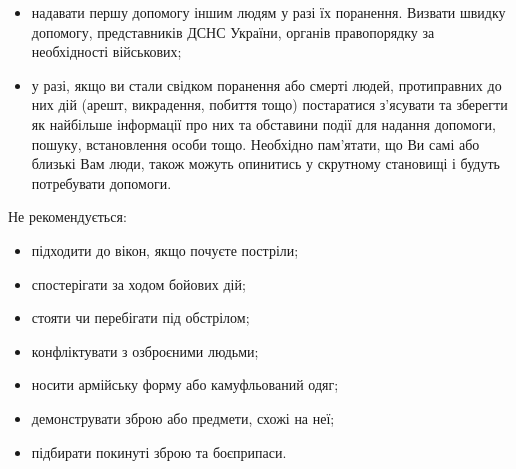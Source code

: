 \begin{itemize}
	\item надавати першу допомогу іншим людям у разі їх поранення. Визвати швидку допомогу, представників ДСНС України, органів правопорядку за необхідності військових;
	\item у разі, якщо ви стали свідком поранення або смерті людей, протиправних до них дій (арешт, викрадення, побиття тощо) постаратися з’ясувати та зберегти як найбільше інформації про них та обставини події для надання допомоги, пошуку, встановлення особи тощо. Необхідно пам’ятати, що Ви самі або близькі Вам люди, також можуть опинитись у скрутному становищі і будуть потребувати допомоги.
\end{itemize}

Не рекомендується: 
\begin{itemize}
	\item підходити до вікон, якщо почуєте постріли;
	\item спостерігати за ходом бойових дій;
	\item стояти чи перебігати під обстрілом;
	\item конфліктувати з озброєними людьми;
	\item носити армійську форму або камуфльований одяг;
	\item демонструвати зброю або предмети, схожі на неї;
	\item підбирати покинуті зброю та боєприпаси.
\end{itemize}




